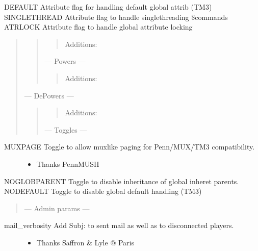 \documentclass[letterpaper,10pt,english]{sphinxmanual}
\begin{document}
\sphinxAtStartPar
DEFAULT \sphinxhyphen{} Attribute flag for handling default global attrib (TM3)
SINGLETHREAD \sphinxhyphen{} Attribute flag to handle single\sphinxhyphen{}threading \$commands
ATRLOCK \sphinxhyphen{} Attribute flag to handle global attribute locking
\begin{quote}
\begin{quote}
\begin{quote}

\sphinxAtStartPar
Additions:
\end{quote}

\sphinxAtStartPar
— Powers —
\begin{quote}

\sphinxAtStartPar
Additions:
\end{quote}
\end{quote}

\sphinxAtStartPar
— De\sphinxhyphen{}Powers —
\begin{quote}
\begin{quote}

\sphinxAtStartPar
Additions:
\end{quote}

\sphinxAtStartPar
— Toggles —
\end{quote}
\end{quote}
\begin{description}
\item[{MUXPAGE \sphinxhyphen{} Toggle to allow mux\sphinxhyphen{}like paging for Penn/MUX/TM3 compatibility.}] \leavevmode\begin{itemize}
\item {} 
\sphinxAtStartPar
Thanks PennMUSH

\end{itemize}

\end{description}

\sphinxAtStartPar
NOGLOBPARENT \sphinxhyphen{} Toggle to disable inheritance of global inheret parents.
NODEFAULT \sphinxhyphen{} Toggle to disable global default handling (TM3)
\begin{quote}

\sphinxAtStartPar
— Admin params —
\end{quote}
\begin{description}
\item[{mail\_verbosity \sphinxhyphen{} Add Subj: to sent mail as well as to disconnected players.}] \leavevmode\begin{itemize}
\item {} 
\sphinxAtStartPar
Thanks Saffron \& Lyle @ Paris

\end{itemize}

\end{description}
\end{document}
